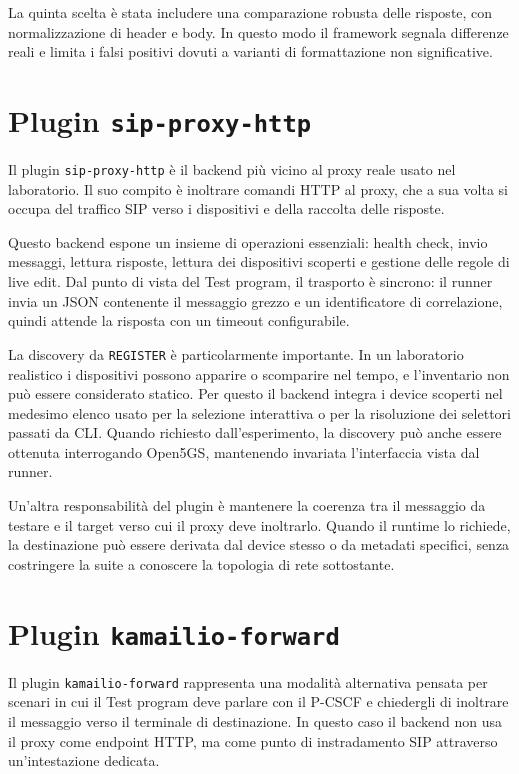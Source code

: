 La quinta scelta \`e stata includere una comparazione robusta delle risposte, con normalizzazione di header e body. In questo modo il framework segnala differenze reali e limita i falsi positivi dovuti a varianti di formattazione non significative.

\section{Plugin \texttt{sip-proxy-http}}
Il plugin \texttt{sip-proxy-http} \`e il backend pi\`u vicino al proxy reale usato nel laboratorio. Il suo compito \`e inoltrare comandi HTTP al proxy, che a sua volta si occupa del traffico SIP verso i dispositivi e della raccolta delle risposte.

Questo backend espone un insieme di operazioni essenziali: health check, invio messaggi, lettura risposte, lettura dei dispositivi scoperti e gestione delle regole di live edit. Dal punto di vista del Test program, il trasporto \`e sincrono: il runner invia un JSON contenente il messaggio grezzo e un identificatore di correlazione, quindi attende la risposta con un timeout configurabile.

La discovery da \texttt{REGISTER} \`e particolarmente importante. In un laboratorio realistico i dispositivi possono apparire o scomparire nel tempo, e l'inventario non pu\`o essere considerato statico. Per questo il backend integra i device scoperti nel medesimo elenco usato per la selezione interattiva o per la risoluzione dei selettori passati da CLI. Quando richiesto dall'esperimento, la discovery pu\`o anche essere ottenuta interrogando Open5GS, mantenendo invariata l'interfaccia vista dal runner.

Un'altra responsabilit\`a del plugin \`e mantenere la coerenza tra il messaggio da testare e il target verso cui il proxy deve inoltrarlo. Quando il runtime lo richiede, la destinazione pu\`o essere derivata dal device stesso o da metadati specifici, senza costringere la suite a conoscere la topologia di rete sottostante.

\section{Plugin \texttt{kamailio-forward}}
Il plugin \texttt{kamailio-forward} rappresenta una modalit\`a alternativa pensata per scenari in cui il Test program deve parlare con il P-CSCF e chiedergli di inoltrare il messaggio verso il terminale di destinazione. In questo caso il backend non usa il proxy come endpoint HTTP, ma come punto di instradamento SIP attraverso un'intestazione dedicata.

